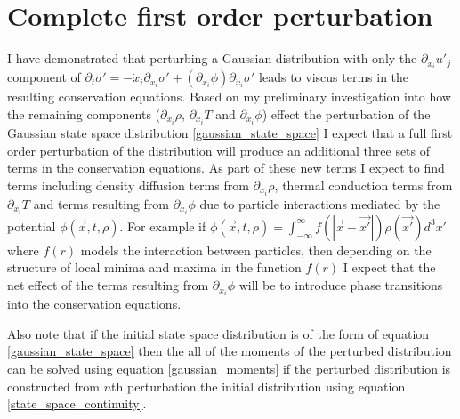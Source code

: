 \documentclass[%
 twocolumn,
 amsmath,amssymb,
 aps,
]{revtex4-1}
\begin{document}
\section{Complete first order perturbation}
I have demonstrated that perturbing a Gaussian distribution with only the $\partial_{x_i}u'_j$ component of $\partial_t \sigma'=-\dot{x}_i\partial_{x_i}\sigma'+\left(\partial_{x_i}\phi\right)\partial_{\dot{x}_i}\sigma'$ leads to viscus terms in the resulting conservation equations. Based on my preliminary investigation into how the remaining components ($\partial_{x_i}\rho$, $\partial_{x_i}T$ and $\partial_{x_i}\phi$) effect the perturbation of the Gaussian state space distribution \eqref{gaussian_state_space} I expect that a full first order perturbation of the distribution will produce an additional three sets of terms in the conservation equations. As part of these new terms I expect to find terms including density diffusion terms from $\partial_{x_i}\rho$, thermal conduction terms from $\partial_{x_i}T$ and terms resulting from $\partial_{x_i}\phi$ due to particle interactions mediated by the potential $\phi\left(\vec{x}, t, \rho\right)$. For example if $\phi\left(\vec{x}, t, \rho\right)=\int_{-\infty}^{\infty}f(|\vec{x}-\vec{x'}|)\rho(\vec{x'})d^3x'$ where $f(r)$ models the interaction between particles, then depending on the structure of local minima and maxima in the function $f(r)$ I expect that the net effect of the terms resulting from $\partial_{x_i}\phi$ will be to introduce phase transitions into the conservation equations.

Also note that if the initial state space distribution is of the form of equation \eqref{gaussian_state_space} then the all of the moments of the perturbed distribution can be solved using equation \eqref{gaussian_moments} if the perturbed distribution is constructed from $n$th perturbation the initial distribution using equation \eqref{state_space_continuity}.
\end{document}
